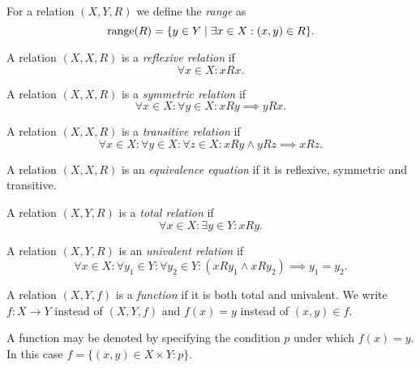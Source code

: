 \documentclass[../../main.tex]{subfiles}
\begin{document}
\begin{notation}[Range]
    For a relation $(X,Y,R)$ we define the \emph{range} as
    \begin{equation*}
        \operatorname{range}(R)=\{y\in Y\mid\exists x\in X:(x,y)\in R\}.
    \end{equation*}
\end{notation}
\begin{definition}
    A relation $(X,X,R)$ is a \emph{reflexive relation} if
    \begin{equation*}
        \forall x\in X:xRx.
    \end{equation*}
\end{definition}
\begin{definition}
    A relation $(X,X,R)$ is a \emph{symmetric relation} if
    \begin{equation*}
        \forall x\in X:\forall y\in X:xRy\implies yRx.
    \end{equation*}
\end{definition}
\begin{definition}
    A relation $(X,X,R)$ is a \emph{transitive relation} if
    \begin{equation*}
        \forall x\in X:\forall y\in X:\forall z\in X:xRy\land yRz\implies xRz.
    \end{equation*}
\end{definition}
\begin{definition}
    A relation $(X,X,R)$ is an \emph{equivalence equation} if it is reflexive, symmetric and transitive.
\end{definition}
\begin{definition}
    A relation $(X,Y,R)$ is a \emph{total relation} if
    \begin{equation*}
        \forall x\in X:\exists y\in Y:xRy.
    \end{equation*}
\end{definition}
\begin{definition}
    A relation $(X,Y,R)$ is an \emph{univalent relation} if
    \begin{equation*}
        \forall x\in X:\forall y_1\in Y:\forall y_2\in Y:(xRy_1\land xRy_2)\implies y_1=y_2.
    \end{equation*}
\end{definition}
\begin{definition}[Function]
    A relation $(X,Y,f)$ is a \emph{function} if it is both total and univalent. We write $f:X\to Y$ instead of $(X,Y,f)$ and $f(x)=y$ instead of $(x,y)\in f$.

    A function may be denoted by specifying the condition $p$ under which $f(x)=y$. In this case $f=\{(x,y)\in X\times Y:p\}$.
\end{definition}
\end{document}
